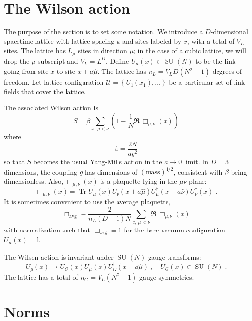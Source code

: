 \documentclass[preprint,aps,prd]{revtex4-2}
\newcommand{\da}{\dagger}  %
\newcommand{\be}{\begin{equation}}
\newcommand{\eq}{\end{equation}}
\newcommand{\plaquette}{\Box}
\newcommand{\config}{\mathcal{U}}
\DeclareMathOperator{\SU}{SU}
\DeclareMathOperator{\Tr}{Tr}
\begin{document}
\section{The Wilson action}

The purpose of the section is to set some notation.
We introduce a $D$-dimensional spacetime lattice with lattice
spacing $a$ and sites labeled by $x$, with a total of $V_L$ sites.
The lattice has $L_\mu$ sites in direction $\mu$;
in the case of a cubic lattice, we will drop the $\mu$ subscript
and $V_L = L^D$.
Define $U_\mu(x) \in \SU(N)$ to be the link going from site $x$ to
site $x+a \hat{\mu}$.
The lattice has $n_L=V_L D \left(N^2-1\right)$ degrees of freedom.
Let lattice configuration
$\config=\left\{U_1(x_1),\ldots\right\}$
be a particular set of link fields that cover the lattice.

The associated Wilson action is
%
\be
S = \beta \sum_{x,\, \mu<\nu} \left(1-\frac{1}{N} \Re\, \plaquette_{\mu,\nu}(x)\right) \label{action}
\eq
where
\be
\beta=\frac{2 N}{a g^2}
\eq
so that $S$ becomes the usual Yang-Mills action in the $a\to 0$ limit.
In $D=3$ dimensions, the coupling $g$ has dimensions of
$\left(\mbox{mass}\right)^{1/2}$, consistent with $\beta$ being dimensionless.
Also, $\plaquette_{\mu,\nu}(x)$ is a plaquette lying in the $\mu\nu$-plane:
\be
\plaquette_{\mu,\nu}(x) = \Tr U_\mu(x) U_\nu(x+a \hat{\mu})
U_\mu^\da(x+a\hat{\nu}) U_\nu^\da(x) \; .
\eq
It is sometimes convenient to use the average plaquette,
\be
      \plaquette_\mathrm{avg} = \frac{2}{n_L (D-1) N}
             \sum_{x,\,\mu<\nu} \Re\,\plaquette_{\mu,\nu}(x) 
\eq
with normalization such that $\plaquette_\mathrm{avg}=1$
for the bare vacuum configuration $U_\mu(x) = \mathbb{I}$.

The Wilson action is invariant under $\SU(N)$ gauge transforms:
%
\be
    U_\mu(x) \to U_G(x) U_\mu(x) U_G^\da(x+a \hat{\mu})
         \; , \quad U_G(x) \in \SU(N) \; .
\eq
%
The lattice has a total of $n_G = V_L\left(N^2-1\right)$ gauge symmetries.

\section{Norms}
\end{document}
